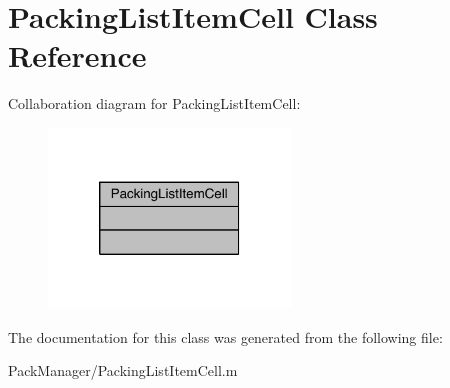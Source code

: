 \hypertarget{class_packing_list_item_cell}{\section{Packing\-List\-Item\-Cell Class Reference}
\label{class_packing_list_item_cell}
}


Collaboration diagram for Packing\-List\-Item\-Cell\-:\nopagebreak
\begin{figure}[H]
\begin{center}
\leavevmode
\includegraphics[width=182pt]{class_packing_list_item_cell__coll__graph}
\end{center}
\end{figure}


The documentation for this class was generated from the following file\-:\begin{DoxyCompactItemize}
\item 
Pack\-Manager/Packing\-List\-Item\-Cell.\-m\end{DoxyCompactItemize}
